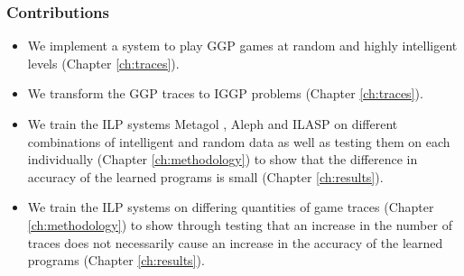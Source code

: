 \subsubsection{Contributions}
\begin{itemize}
\item We implement a system to play GGP games at random and highly intelligent levels (Chapter \ref{ch:traces}).
\item We transform the GGP traces to IGGP problems (Chapter \ref{ch:traces}).
\item We train the ILP systems Metagol \cite{Metagol/Github}, Aleph \cite{Muggleton/Aleph} and ILASP \cite{MarkLaw/ILASP2i, MarkLaw/OG-ILASP,MarkLaw/Thesis} on different combinations of intelligent and random data as well as testing them on each individually (Chapter \ref{ch:methodology}) to show that the difference in accuracy of the learned programs is small (Chapter \ref{ch:results}).
\item We train the ILP systems on differing quantities of game traces (Chapter \ref{ch:methodology}) to show through testing that an increase in the number of traces does not necessarily cause an increase in the accuracy of the learned programs (Chapter \ref{ch:results}).

\end{itemize}